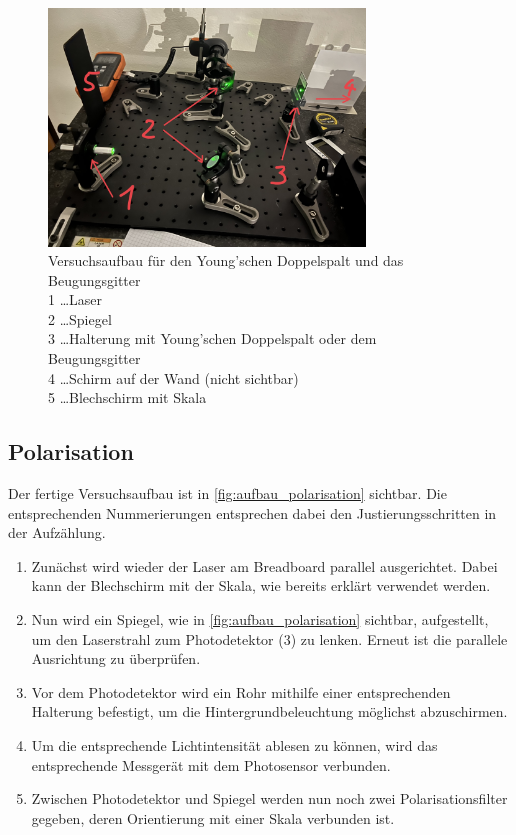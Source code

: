 \documentclass[12pt,english,ngerman]{scrartcl}
\begin{document}
\begin{figure}[H]
	\begin{center}
		\includegraphics[width =0.75\textwidth]{./figures/aufbau_doppelspalt.jpg}
	\end{center}
	\caption[Versuchsaufbau für den Young'schen Doppelspalt und das Beugungsgitter] {
		Versuchsaufbau für den Young'schen Doppelspalt und das Beugungsgitter       \\
		1 \dots Laser                                    \\
		2 \dots Spiegel                                                      \\
		3 \dots Halterung mit Young'schen Doppelspalt oder dem Beugungsgitter                         \\
		4 \dots Schirm auf der Wand (nicht sichtbar) \\
		5 \dots Blechschirm mit Skala   
	}\label{fig:aufbau_doppelspalt}
\end{figure}

\subsection{Polarisation}

Der fertige Versuchsaufbau ist in \autoref{fig:aufbau_polarisation} sichtbar. Die entsprechenden Nummerierungen entsprechen dabei den 
Justierungsschritten in der Aufzählung.

\begin{enumerate}
    \item Zunächst wird wieder der Laser am Breadboard parallel ausgerichtet. Dabei kann der Blechschirm mit der Skala, 
    wie bereits erklärt verwendet werden.
    \item Nun wird ein Spiegel, wie in \autoref{fig:aufbau_polarisation} sichtbar, aufgestellt, um den Laserstrahl 
    zum Photodetektor (3) zu lenken. Erneut ist die parallele Ausrichtung zu überprüfen.
    \item Vor dem Photodetektor wird ein Rohr mithilfe einer entsprechenden Halterung befestigt, um die Hintergrundbeleuchtung
    möglichst abzuschirmen.
    \item Um die entsprechende Lichtintensität ablesen zu können, wird das entsprechende Messgerät mit dem Photosensor verbunden.
    \item Zwischen Photodetektor und Spiegel werden nun noch zwei Polarisationsfilter gegeben, deren Orientierung mit 
    einer Skala verbunden ist.
\end{enumerate}
\end{document}

